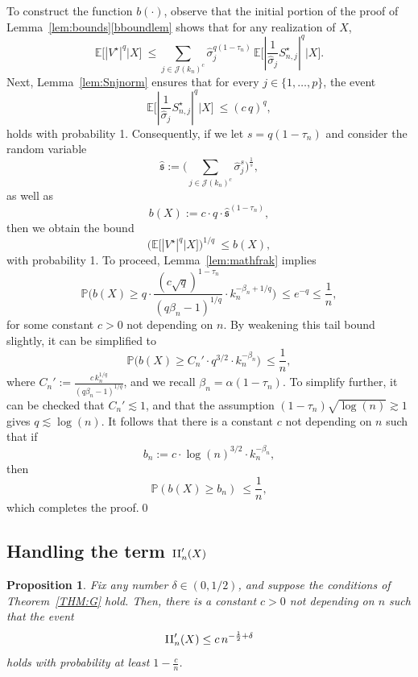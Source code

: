 \documentclass[aos,preprint]{imsart}
\numberwithin{equation}{section}
\theoremstyle{plain}
\newtheorem{proposition}{Proposition}[section]
\renewcommand{\hat}[1]{\widehat{#1}}
\newcommand{\II}{\textsc{II}}
\newcommand{\J}{\mathcal{J}}
\renewcommand{\P}{\mathbb{P}}
\newcommand{\E}{\mathbb{E}}
\newcommand{\ts}{\textstyle}
\newcommand{\1}{{\bf{1}}}
\newcommand{\0}{\mathbf{0}}
\begin{document}
To construct the function $b(\cdot)$, observe that the initial portion of the proof of Lemma~\ref{lem:bounds}\eqref{bboundlem} shows that for any realization of $X$,
\begin{equation}\label{eqn:Vstarbound}
 \E\big[|V^{\star}|^q\big | X\big]\ \leq   \sum_{j\in\J(k_n)^c} \hat\sigma_j^{q(1-\tau_n)}\,\E\big[|\ts\frac{1}{\hat \sigma_j}S_{n,j}^{\star}|^q|X\big].
\end{equation}
%
Next, Lemma~\ref{lem:Snjnorm} ensures that for every $j\in\{1,\dots,p\}$, the event
%
$$ \E\big[|\ts\frac{1}{\hat \sigma_j}S_{n,j}^{\star}|^q|X\big] \ \leq (c\,q)^q, $$
holds with probability 1.
Consequently, if we let $s=q(1-\tau_n)$ and consider the random variable
\begin{equation}
\hat{\mathfrak{s}}:=\Bigg(\sum_{j\in\J(k_n)^c}\hat\sigma_j^{s}\Bigg)^{\frac{1}{s}},
\end{equation}
as well as
$$b(X):=c\cdot q\cdot  \hat{\mathfrak{s}}^{(1-\tau_n)},$$
then we obtain the bound
\begin{equation}
\Big( \E\big[|V^{\star}|^q\big | X\big]\Big)^{1/q} \ \leq b(X),
\end{equation}
with probability 1.
%
To proceed, Lemma~\ref{lem:mathfrak} implies 
\begin{equation}
\P\bigg(b(X) \geq  q\cdot \ts\frac{(c\sqrt q)^{1-\tau_n}}{(q\beta_n-1)^{1/q}}\cdot k_n^{-\beta_n+1/q}\bigg) \ \leq e^{-q}\leq \frac 1n,
\end{equation}
for some constant $c>0$ not depending on $n$.
%
By weakening this tail bound slightly, it can be simplified to
%
\begin{equation}
\P\bigg(b(X) \geq C_n'\cdot  q^{3/2} \cdot k_n^{-\beta_n}\bigg) \ \leq \ts\frac 1n,
\end{equation}
where  $C_n':=\ts\frac{ c \,k_n^{1/q}}{(q\beta_n-1)^{1/q}}$, and we recall $\beta_n=\alpha(1-\tau_n)$.
To simplify further, it can be checked that $C_n'\lesssim 1$, and that the assumption $(1-\tau_n)\sqrt{\log(n)}\gtrsim 1$ gives $q\lesssim \log(n)$. It follows that there is a constant $c$ not depending on $n$ such that if
$$b_n:=c\cdot \log(n)^{3/2} \cdot  k_n^{-\beta_n},$$
then
\begin{equation}
\P(b(X)\geq  b_n)  \ \leq \ts\frac 1n,
\end{equation}
which completes the proof.\qed



\subsection{Handling the term $\II_n'(X)$}\label{sec:II'}
\begin{proposition}\label{prop:IIprime}
Fix any number $\delta\in(0,1/2)$, and suppose the conditions of Theorem~\ref{THM:G} hold. Then, there is a constant $c>0$ not depending on $n$ such that the event
\begin{equation}
\II_n'(X) \leq c\, n^{-\frac 12+\delta}
\end{equation}
holds with probability at least $1-\frac cn$.
%
\end{proposition}
\end{document}
